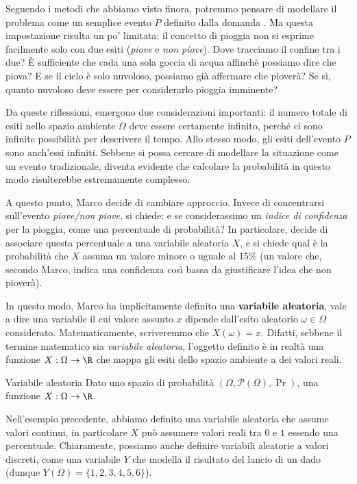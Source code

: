 \documentclass[a4paper, 12pt]{report}
\begin{document}
    Seguendo i metodi che abbiamo visto finora, potremmo pensare di modellare il problema come un semplice evento $P$ definito dalla domanda . Ma questa impostazione risulta un po' limitata: il concetto di pioggia non si esprime facilmente solo con due esiti (\textit{piove} e \textit{non piove}). Dove tracciamo il confine tra i due? È sufficiente che cada una sola goccia di acqua affinchè possiamo dire che piova? E se il cielo è solo nuvoloso, possiamo già affermare che pioverà? Se sì, quanto nuvoloso deve essere per considerarlo pioggia imminente?

    Da queste riflessioni, emergono due considerazioni importanti: il numero totale di esiti nello spazio ambiente $\Omega$ deve essere certamente infinito, perché ci sono infinite possibilità per descrivere il tempo. Allo stesso modo, gli esiti dell'evento $P$ sono anch'essi infiniti. Sebbene si possa cercare di modellare la situazione come un evento tradizionale, diventa evidente che calcolare la probabilità in questo modo risulterebbe estremamente complesso.

    A questo punto, Marco decide di cambiare approccio. Invece di concentrarsi sull'evento \textit{piove/non piove}, si chiede: e se considerassimo un \textit{indice di confidenza} per la pioggia, come una percentuale di probabilità? In particolare, decide di associare questa percentuale a una variabile aleatoria $X$, e si chiede qual è la probabilità che $X$ assuma un valore minore o uguale al 15\% (un valore che, secondo Marco, indica una confidenza così bassa da giustificare l'idea che non pioverà).
    
    In questo modo, Marco ha implicitamente definito una \textbf{variabile aleatoria}, vale a dire una variabile il cui valore assunto $x$ dipende dall'esito aleatorio $\omega \in \Omega$ considerato. Matematicamente, scriveremmo che $X(\omega) = x$. Difatti, sebbene il termine matematico sia \textit{variabile aleatoria}, l'oggetto definito è in realtà una funzione  $X : \Omega \to \R$ che mappa gli esiti dello spazio ambiente a dei valori reali.

    \begin{frameddefn}{Variabile aleatoria}
        Dato uno spazio di probabilità $(\Omega, \mathcal{P}(\Omega), \Pr)$, una funzione $X : \Omega \to \R$.
    \end{frameddefn}

    Nell'esempio precedente, abbiamo definito una variabile aleatoria che assume valori continui, in particolare $X$ può assumere valori reali tra $0$ e $1$ essendo una percentuale. Chiaramente, possiamo anche definire variabili aleatorie a valori discreti, come una variabile $Y$ che modella il risultato del lancio di un dado (dunque $Y(\Omega) = \{1,2,3,4,5,6\}$).
\end{document}
